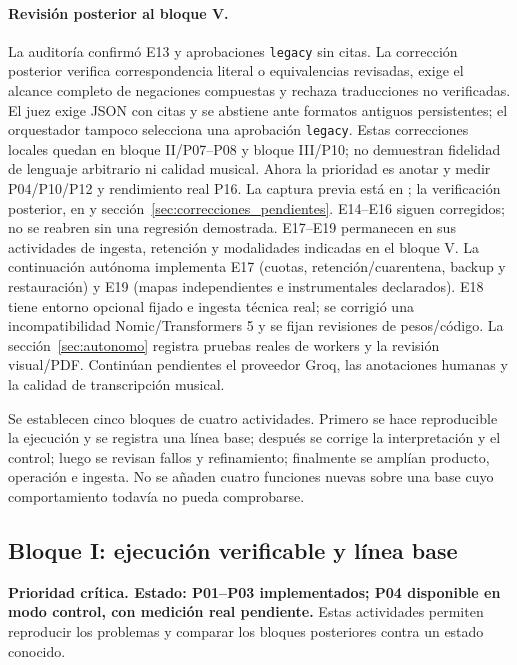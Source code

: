 \paragraph{Revisión posterior al bloque V.}
La auditoría confirmó E13 y aprobaciones \texttt{legacy} sin citas. La corrección
posterior verifica correspondencia literal o equivalencias revisadas, exige el
alcance completo de negaciones compuestas y rechaza traducciones no verificadas.
El juez exige JSON con citas y se abstiene ante formatos antiguos persistentes;
el orquestador tampoco selecciona una aprobación \texttt{legacy}.
Estas correcciones locales quedan en bloque II/P07--P08 y bloque III/P10;
no demuestran fidelidad de lenguaje arbitrario ni calidad musical.
Ahora la prioridad es anotar y medir P04/P10/P12 y rendimiento real P16.
La captura previa está en ;
la verificación posterior, en  y
sección~\ref{sec:correcciones_pendientes}. E14--E16 siguen corregidos;
no se reabren sin una regresión demostrada. E17--E19 permanecen en sus actividades
de ingesta, retención y modalidades indicadas en el bloque V.
La continuación autónoma implementa E17 (cuotas, retención/cuarentena, backup y
restauración) y E19 (mapas independientes e instrumentales declarados). E18 tiene
entorno opcional fijado e ingesta técnica real; se corrigió una incompatibilidad
Nomic/Transformers 5 y se fijan revisiones de pesos/código. La sección~\ref{sec:autonomo}
registra pruebas reales de workers y la revisión visual/PDF. Continúan pendientes
el proveedor Groq, las anotaciones humanas y la calidad de transcripción musical.

Se establecen cinco bloques de cuatro actividades. Primero se hace reproducible
la ejecución y se registra una línea base; después se corrige la interpretación
y el control; luego se revisan fallos y refinamiento; finalmente se amplían
producto, operación e ingesta. No se añaden cuatro funciones nuevas sobre una
base cuyo comportamiento todavía no pueda comprobarse.

\subsection{Bloque I: ejecución verificable y línea base}
\textbf{Prioridad crítica. Estado: P01--P03 implementados; P04 disponible en modo control, con medición real pendiente.}
Estas actividades permiten reproducir los problemas y comparar los bloques
posteriores contra un estado conocido.

